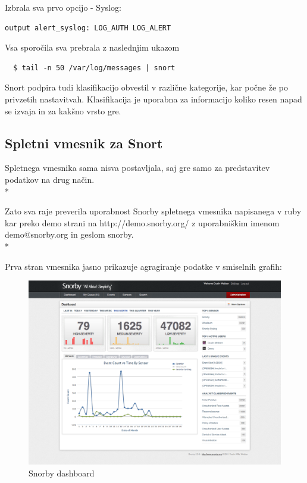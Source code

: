 \documentclass[12pt]{article}
\begin{document}
Izbrala sva prvo opcijo - Syslog:

\begin{verbatim}
output alert_syslog: LOG_AUTH LOG_ALERT
\end{verbatim}

Vsa sporočila sva prebrala z naslednjim ukazom

\begin{verbatim}
  $ tail -n 50 /var/log/messages | snort
\end{verbatim}

Snort podpira tudi klasifikacijo obvestil v različne kategorije, kar počne že po privzetih nastavitvah.
Klasifikacija je uporabna za informacijo koliko resen napad se izvaja in za kakšno vrsto gre.


\subsection{Spletni vmesnik za Snort}

Spletnega vmesnika sama nisva postavljala, saj gre samo za predstavitev podatkov na drug način.
\\*

Zato sva raje preverila uporabnost Snorby spletnega vmesnika napisanega v ruby kar preko demo strani na
http://demo.snorby.org/ z uporabniškim imenom demo@snorby.org in geslom snorby.
\\*

Prva stran vmesnika jasno prikazuje agragiranje podatke v smiselnih grafih:

\begin{figure}[htb]
\begin{center}
\includegraphics[scale=0.3]{snorby.png}
\end{center}
\caption{Snorby dashboard}
\label{snorby}
\end{figure}
\end{document}
